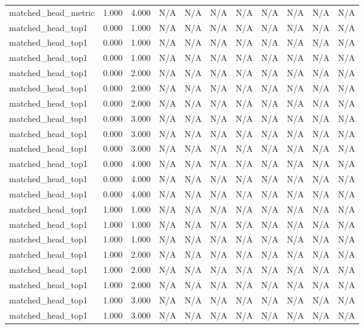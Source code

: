 \begin{table}[h!]
\begin{tabular}{lrrrrrrrrrr}
matched\_head\_metric & 1.000 & 4.000 & N/A & N/A & N/A & N/A & N/A & N/A & N/A & N/A \\
matched\_head\_top1 & 0.000 & 1.000 & N/A & N/A & N/A & N/A & N/A & N/A & N/A & N/A \\
matched\_head\_top1 & 0.000 & 1.000 & N/A & N/A & N/A & N/A & N/A & N/A & N/A & N/A \\
matched\_head\_top1 & 0.000 & 1.000 & N/A & N/A & N/A & N/A & N/A & N/A & N/A & N/A \\
matched\_head\_top1 & 0.000 & 2.000 & N/A & N/A & N/A & N/A & N/A & N/A & N/A & N/A \\
matched\_head\_top1 & 0.000 & 2.000 & N/A & N/A & N/A & N/A & N/A & N/A & N/A & N/A \\
matched\_head\_top1 & 0.000 & 2.000 & N/A & N/A & N/A & N/A & N/A & N/A & N/A & N/A \\
matched\_head\_top1 & 0.000 & 3.000 & N/A & N/A & N/A & N/A & N/A & N/A & N/A & N/A \\
matched\_head\_top1 & 0.000 & 3.000 & N/A & N/A & N/A & N/A & N/A & N/A & N/A & N/A \\
matched\_head\_top1 & 0.000 & 3.000 & N/A & N/A & N/A & N/A & N/A & N/A & N/A & N/A \\
matched\_head\_top1 & 0.000 & 4.000 & N/A & N/A & N/A & N/A & N/A & N/A & N/A & N/A \\
matched\_head\_top1 & 0.000 & 4.000 & N/A & N/A & N/A & N/A & N/A & N/A & N/A & N/A \\
matched\_head\_top1 & 0.000 & 4.000 & N/A & N/A & N/A & N/A & N/A & N/A & N/A & N/A \\
matched\_head\_top1 & 1.000 & 1.000 & N/A & N/A & N/A & N/A & N/A & N/A & N/A & N/A \\
matched\_head\_top1 & 1.000 & 1.000 & N/A & N/A & N/A & N/A & N/A & N/A & N/A & N/A \\
matched\_head\_top1 & 1.000 & 1.000 & N/A & N/A & N/A & N/A & N/A & N/A & N/A & N/A \\
matched\_head\_top1 & 1.000 & 2.000 & N/A & N/A & N/A & N/A & N/A & N/A & N/A & N/A \\
matched\_head\_top1 & 1.000 & 2.000 & N/A & N/A & N/A & N/A & N/A & N/A & N/A & N/A \\
matched\_head\_top1 & 1.000 & 2.000 & N/A & N/A & N/A & N/A & N/A & N/A & N/A & N/A \\
matched\_head\_top1 & 1.000 & 3.000 & N/A & N/A & N/A & N/A & N/A & N/A & N/A & N/A \\
matched\_head\_top1 & 1.000 & 3.000 & N/A & N/A & N/A & N/A & N/A & N/A & N/A & N/A \\

\end{tabular}
\end{table}
